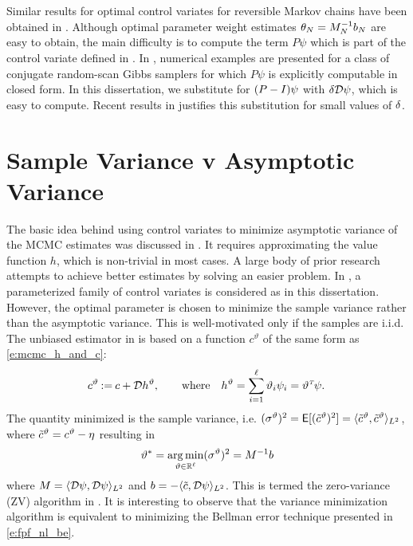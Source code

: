 Similar results for optimal control variates for reversible Markov chains have been obtained in \cite{delkon12}. Although optimal parameter weight estimates $\theta_N = M_N^{-1} b_N$ are easy to obtain, the main difficulty is to compute the term $P\psi$ which is part of the control variate defined in . In \cite{delkon12}, numerical examples are presented for a class of conjugate random-scan Gibbs samplers for which $P\psi$ is explicitly computable in closed form. In this dissertation, we substitute for $(P-I)\psi$ with $\delta {\cal D} \psi$, which is easy to compute. Recent results in \cite{brodurmeymourad18} justifies this substitution for small values of $\delta$. 

\section{Sample Variance v Asymptotic Variance}
\label{s:mcmc_var_vs_asym_var}
The basic idea behind using control variates to minimize asymptotic variance of the MCMC estimates was discussed in . It requires approximating the value function $h$, which is non-trivial in most cases. A large body of prior research \cite{oatgircho,papmirgir14} attempts to achieve better estimates by solving an easier problem. In \cite{papmirgir14}, a parameterized family of control variates is considered as in this dissertation. However, the optimal parameter is chosen to minimize the sample variance rather than the asymptotic variance. This is well-motivated only  if the samples are i.i.d. 
The unbiased estimator in \cite{papmirgir14} is based on a function $c^{\vartheta}$ of the same form as \eqref{e:mcmc_h_and_c}:
\[
\begin{aligned}
c^\vartheta  \mathbin{:=} c + {\cal D} h^\vartheta,
\qquad
\text{where}
\quad
h^\vartheta  =  \sum_{i=1}^\ell \vartheta_i \psi_i = \vartheta^{\hbox{\tiny\it T}} \psi.\,
\end{aligned}
\]
The quantity minimized is the sample variance, i.e. $(\sigma^\vartheta)^2 = {\sf E}[(\tilde c^{\vartheta})^2] = \langle \tilde c^\vartheta, \tilde c^\vartheta \rangle_{L^2}$, where $\tilde c^\vartheta = c^\vartheta - \eta$ resulting in
\begin{equation}
\vartheta^*= \argmin_{\vartheta \in \Re^\ell} (\sigma^\vartheta)^2  = M^{-1} b
\label{e:mcmc_var_theta_star}
\end{equation}
where $M = \langle {\cal D} \psi,  {\cal D} \psi \rangle_{L^2}$ and $b = - \langle \tilde c, {\cal D} \psi \rangle_{L^2}$. This is termed the zero-variance (ZV) algorithm in \cite{papmirgir14}. It is interesting to observe that the variance minimization algorithm is equivalent to minimizing the Bellman error technique presented in \eqref{e:fpf_nl_be}.

